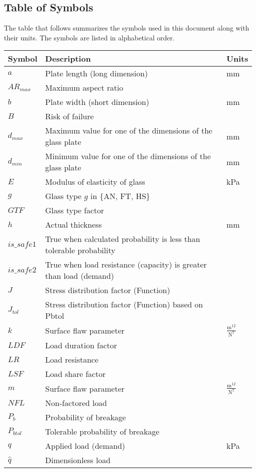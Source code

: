 \documentclass[12pt]{article}
\begin{document}
\subsection{Table of Symbols}
\label{Sec:TablofSymb}
The table that follows summarizes the symbols used in this document along with their units. The symbols are listed in alphabetical order.
\begin{longtable*}{l l l}
\toprule
Symbol & Description & Units
\\
\midrule
$a$ & Plate length (long dimension) & mm
\\
$AR_{max}$ & Maximum aspect ratio & 
\\
$b$ & Plate width (short dimension) & mm
\\
$B$ & Risk of failure & 
\\
$d_{max}$ & Maximum value for one of the dimensions of the glass plate & mm
\\
$d_{min}$ & Minimum value for one of the dimensions of the glass plate & mm
\\
$E$ & Modulus of elasticity of glass & kPa
\\
$g$ & Glass type $g$ in \{AN, FT, HS\} & 
\\
$GTF$ & Glass type factor & 
\\
$h$ & Actual thickness & mm
\\
$is\_safe1$ & True when calculated probability is less than tolerable probability & 
\\
$is\_safe2$ & True when load resistance (capacity) is greater than load (demand) & 
\\
$J$ & Stress distribution factor (Function) & 
\\
$J_{tol}$ & Stress distribution factor (Function) based on Pbtol & 
\\
$k$ & Surface flaw parameter & $\frac{\text{m}^{12}}{\text{N}^{7}}$
\\
$LDF$ & Load duration factor & 
\\
$LR$ & Load resistance & 
\\
$LSF$ & Load share factor & 
\\
$m$ & Surface flaw parameter & $\frac{\text{m}^{12}}{\text{N}^{7}}$
\\
$NFL$ & Non-factored load & 
\\
$P_{b}$ & Probability of breakage & 
\\
$P_{btol}$ & Tolerable probability of breakage & 
\\
$q$ & Applied load (demand) & kPa
\\
$\hat{q}$ & Dimensionless load & 

\end{longtable*}
\end{document}
